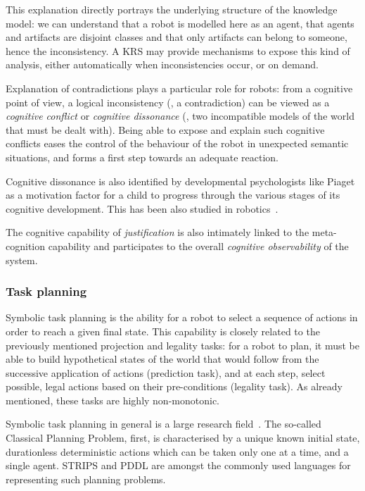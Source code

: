 This explanation directly portrays the underlying structure of the knowledge
model: we can understand that a robot is modelled here as an agent, that agents
and artifacts are disjoint classes and that only artifacts can belong to
someone, hence the inconsistency. A KRS may provide mechanisms to expose this
kind of analysis, either automatically when inconsistencies occur, or on
demand.

Explanation of contradictions plays a particular role for robots: from a
cognitive point of view, a logical inconsistency (\ie, a contradiction) can be
viewed as a \emph{cognitive conflict} or \emph{cognitive dissonance} (\ie, two
incompatible models of the world that must be dealt with). Being able to expose
and explain such cognitive conflicts eases the control of the behaviour of the
robot in unexpected semantic situations, and forms a first step towards an
adequate reaction.

Cognitive dissonance is also identified by developmental psychologists like
Piaget as a motivation factor for a child to progress through the various
stages of its cognitive development. This has been also studied in
robotics~\cite{Oudeyer2007}.

The cognitive capability of \emph{justification} is also intimately linked to
the meta-cognition capability and participates to the overall \emph{cognitive
observability} of the system.

\subsubsection{Task planning}
\label{sect|planning}

Symbolic task planning is the ability for a robot to select a sequence of
actions in order to reach a given final state. This capability is closely
related to the previously mentioned projection and legality tasks: for a robot
to plan, it must be able to build hypothetical states of the world that would
follow from the successive application of actions (prediction task), and at
each step, select possible, legal actions based on their pre-conditions
(legality task). As already mentioned, these tasks are highly non-monotonic.


Symbolic task planning in general is a large research
field~\cite{Russell2009planning}. The so-called Classical Planning Problem,
first, is characterised by a unique known initial state, durationless
deterministic actions which can be taken only one at a time, and a single
agent. STRIPS and PDDL are amongst the commonly used languages for representing
such planning problems.

